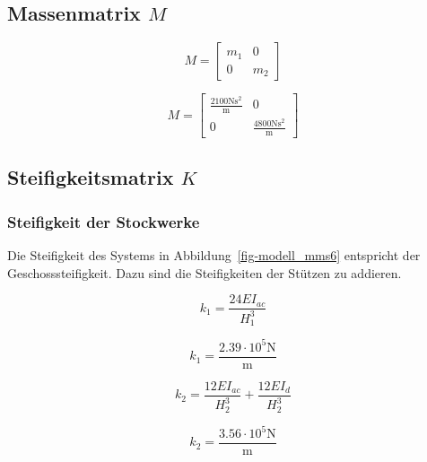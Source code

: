 \documentclass[
  letterpaper,
  DIV=11]{scrreprt}
\begin{document}
\hypertarget{massenmatrix-m-1}{%
\subsection{\texorpdfstring{Massenmatrix
\(M\)}{Massenmatrix M}}\label{massenmatrix-m-1}}

\begin{equation}M = \left[\begin{matrix}m_{1} & 0\\0 & m_{2}\end{matrix}\right]\end{equation}

\begin{equation}M = \left[\begin{matrix}\frac{2100 \text{N} \text{s}^{2}}{\text{m}} & 0\\0 & \frac{4800 \text{N} \text{s}^{2}}{\text{m}}\end{matrix}\right]\end{equation}

\hypertarget{steifigkeitsmatrix-k-1}{%
\subsection{\texorpdfstring{Steifigkeitsmatrix
\(K\)}{Steifigkeitsmatrix K}}\label{steifigkeitsmatrix-k-1}}

\hypertarget{steifigkeit-der-stockwerke-1}{%
\subsubsection{Steifigkeit der
Stockwerke}\label{steifigkeit-der-stockwerke-1}}

Die Steifigkeit des Systems in Abbildung~\ref{fig-modell_mms6}
entspricht der Geschosssteifigkeit. Dazu sind die Steifigkeiten der
Stützen zu addieren.

\begin{equation}k_{1} = \frac{24 EI_{ac}}{H_{1}^{3}}\end{equation}

\begin{equation}k_{1} = \frac{2.39 \cdot 10^{5} \text{N}}{\text{m}}\end{equation}

\begin{equation}k_{2} = \frac{12 EI_{ac}}{H_{2}^{3}} + \frac{12 EI_{d}}{H_{2}^{3}}\end{equation}

\begin{equation}k_{2} = \frac{3.56 \cdot 10^{5} \text{N}}{\text{m}}\end{equation}
\end{document}
